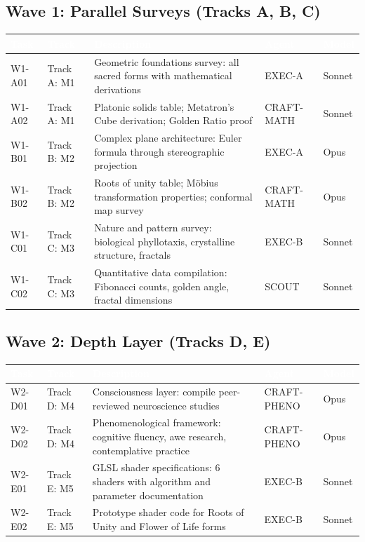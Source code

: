 \documentclass[11pt,letterpaper]{article}
\newcommand{\tableheader}[1]{\textbf{\sffamily\textcolor{white}{#1}}}
\begin{document}
\subsection{Wave 1: Parallel Surveys (Tracks A, B, C)}

\begin{center}
\begin{tabularx}{\textwidth}{L{2cm}L{3cm}XL{2cm}C{2cm}}
\toprule
{}
\tableheader{Task} & \tableheader{Track} & \tableheader{Description} & \tableheader{Agent} & \tableheader{Model} \\
\midrule
W1-A01 & Track A: M1 & Geometric foundations survey: all sacred forms with mathematical derivations & EXEC-A & Sonnet \\
W1-A02 & Track A: M1 & Platonic solids table; Metatron's Cube derivation; Golden Ratio proof & CRAFT-MATH & Sonnet \\
W1-B01 & Track B: M2 & Complex plane architecture: Euler formula through stereographic projection & EXEC-A & Opus \\
W1-B02 & Track B: M2 & Roots of unity table; M\"{o}bius transformation properties; conformal map survey & CRAFT-MATH & Opus \\
W1-C01 & Track C: M3 & Nature and pattern survey: biological phyllotaxis, crystalline structure, fractals & EXEC-B & Sonnet \\
W1-C02 & Track C: M3 & Quantitative data compilation: Fibonacci counts, golden angle, fractal dimensions & SCOUT & Sonnet \\
\bottomrule
\end{tabularx}
\end{center}

\subsection{Wave 2: Depth Layer (Tracks D, E)}

\begin{center}
\begin{tabularx}{\textwidth}{L{2cm}L{3cm}XL{2cm}C{2cm}}
\toprule
{}
\tableheader{Task} & \tableheader{Track} & \tableheader{Description} & \tableheader{Agent} & \tableheader{Model} \\
\midrule
W2-D01 & Track D: M4 & Consciousness layer: compile peer-reviewed neuroscience studies & CRAFT-PHENO & Opus \\
W2-D02 & Track D: M4 & Phenomenological framework: cognitive fluency, awe research, contemplative practice & CRAFT-PHENO & Opus \\
W2-E01 & Track E: M5 & GLSL shader specifications: 6 shaders with algorithm and parameter documentation & EXEC-B & Sonnet \\
W2-E02 & Track E: M5 & Prototype shader code for Roots of Unity and Flower of Life forms & EXEC-B & Sonnet \\
\bottomrule
\end{tabularx}
\end{center}
\end{document}

